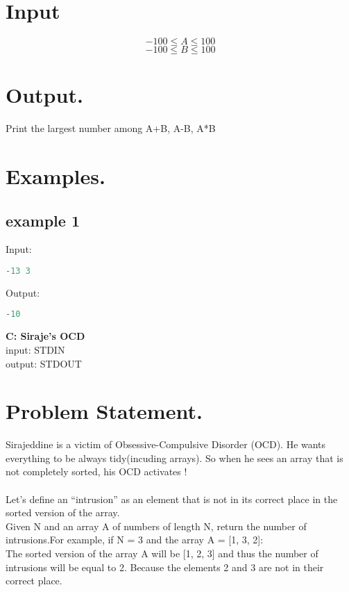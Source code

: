 \documentclass[10pt]{article}
\begin{document}
\paragraph{}
\section{Input}
$$ -100\le A \le 100 $$
$$ -100\le B \le 100 $$
\section{Output.}
Print the largest number among A+B, A-B, A*B
\section{Examples.}
\subsection{example 1}
Input:
\begin{lstlisting}[language=Python]
-13 3
\end{lstlisting}
Output:
\begin{lstlisting}[language=Python]
-10
\end{lstlisting}
\newpage
\begin{center}
    \Huge{    \textbf{C: Siraje's OCD}}\\
        \normalsize  { input:  STDIN}\\
    \normalsize{    output: STDOUT}
\end{center}
\section{Problem Statement.}
Sirajeddine is a victim of Obsessive-Compulsive Disorder (OCD). He wants everything to be always tidy(incuding arrays). So when he sees an array that is not completely sorted, his OCD activates !\\
\\
Let’s define an “intrusion” as an element that is not in its correct place in the sorted version of the array.\\
Given N and an array A of numbers of length N, return the number of intrusions.For example, if N = 3 and the array A = [1, 3, 2]:\\
The sorted version of the array A will be [1, 2, 3] and thus the number of intrusions will be equal to 2. Because the elements 2 and 3 are not in their correct place.
\paragraph{}
\end{document}
